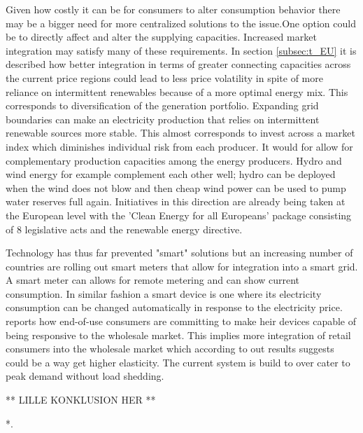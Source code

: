 Given how costly it can be for consumers to alter consumption behavior there may be a bigger need for more centralized solutions to the issue.One option could be to directly affect and alter the supplying capacities.
Increased market integration may satisfy many of these requirements. In section \ref{subsec:t_EU} it is described how better integration in terms of greater connecting capacities across the current price regions could lead to less price volatility in spite of more reliance on intermittent renewables because of a more optimal energy mix. This corresponds to diversification of the generation portfolio. Expanding grid boundaries can make an electricity production that relies on intermittent renewable sources more stable. This almost corresponds to invest across a market index which diminishes individual risk from each producer. It would for allow for complementary production capacities among the energy producers. Hydro and wind energy for example complement each other well;  hydro can be deployed when the wind does not blow and then cheap wind power can be used to pump water reserves full again. Initiatives in this direction are already being taken at the European level with the 'Clean Energy for all Europeans' package consisting of 8 legislative acts and the renewable energy directive.

Technology has thus far prevented "smart" solutions but an increasing number of countries are rolling out smart meters that allow for integration into a smart grid. A smart meter can allows for remote metering and can show current consumption. In similar fashion a smart device is one where its electricity consumption can be changed automatically in response to the electricity price.
\cite{biggar2014economics} reports how end-of-use consumers are committing to make heir devices capable of being responsive to the wholesale market. This implies more integration of retail consumers into the wholesale market which according to out results suggests could be a way get higher elasticity. The current system is build to over cater to peak demand without load shedding. 

** LILLE KONKLUSION HER **


*. %


